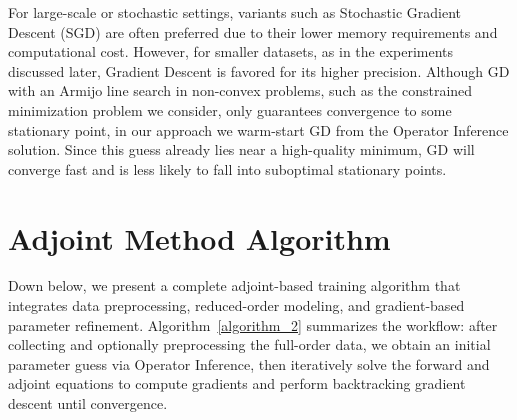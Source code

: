 For large-scale or stochastic settings, variants such as Stochastic Gradient Descent (SGD) are often preferred \cite{ruder2017overviewgradientdescentoptimization} due to their lower memory requirements and computational cost. However, for smaller datasets, as in the experiments discussed later, Gradient Descent is favored for its higher precision. Although GD with an Armijo line search in non-convex problems, such as the constrained minimization problem we consider, only guarantees convergence to some stationary point, in our approach we warm-start GD from the Operator Inference solution. Since this guess already lies near a high-quality minimum, GD will converge fast and is less likely to fall into suboptimal stationary points.


\section{Adjoint Method Algorithm}

Down below, we present a complete adjoint-based training algorithm that integrates data preprocessing, reduced-order modeling, and gradient-based parameter refinement. Algorithm~\ref{algorithm_2} summarizes the workflow: after collecting and optionally preprocessing the full-order data, we obtain an initial parameter guess via Operator Inference, then iteratively solve the forward and adjoint equations to compute gradients and perform backtracking gradient descent until convergence.

